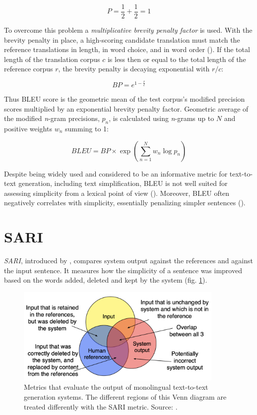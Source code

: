 \[P=\frac{1}{2} + \frac{1}{2}=1\]

To overcome this problem a \emph{multiplicative brevity penalty factor} is used. With the brevity penalty in place, a high-scoring candidate translation must match the reference translations in length, in word choice, and in word order (\cite{papineni-etal-2002-bleu}). If the total length of the translation corpus $c$ is less then or equal to the total length of the reference corpus $r$, the brevity penalty is decaying exponential with $r/c$: 

\[BP=e^{1-\frac{r}{c}}\]

Thus BLEU score is the geometric mean of the test corpus’s modified precision scores multiplied by an exponential brevity penalty factor. Geometric average of the modified \textit{n}-gram precisions, $p_{n}$, is calculated using \textit{n}-grams up to $N$ and positive weights $w_{n}$ summing to 1:

\[BLEU=BP \times \exp(\sum_{n=1}^{N}w_n \log p_n)\]

Despite being widely used and considered to be an informative metric for text-to-text generation, including text simplification, BLEU is not well suited for assessing simplicity from a lexical point of view (\cite{xu-etal-2016-optimizing}). Moreover, BLEU often negatively correlates with simplicity, essentially penalizing simpler sentences (\cite{sulem-etal-2018-bleu}).

\section{SARI}

\emph{SARI}, introduced by \cite{xu-etal-2016-optimizing}, compares system output against the references and against the input sentence. It measures how the simplicity of a sentence was improved based on the words added, deleted and kept by the system (fig. \ref{fig:sari}).

\begin{figure}[h]
    \centering
    \includegraphics[width=10cm]{Images/sari.png}
    \caption{Metrics that evaluate the output of monolingual text-to-text generation systems. The different regions of this Venn diagram are treated differently with the SARI metric. Source: \cite{xu-etal-2016-optimizing}.}
    \label{fig:sari}
\end{figure}


